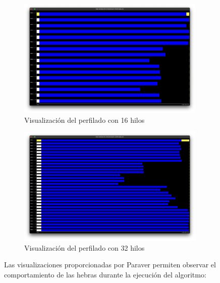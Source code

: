 \documentclass[a4paper, 10pt, onecolumn]{IEEEtran}
\begin{document}
\begin{figure}[H]
  \centering
  \includegraphics[width=0.8\textwidth]{./img/paraver-16threads.png}
  \caption{Visualización del perfilado con 16 hilos}
  \label{fig:paraver_16threads}
\end{figure}

\begin{figure}[H]
  \centering
  \includegraphics[width=0.8\textwidth]{./img/paraver-32threads.png}
  \caption{Visualización del perfilado con 32 hilos}
  \label{fig:paraver_32threads}
\end{figure}

Las visualizaciones proporcionadas por Paraver permiten observar el comportamiento de las hebras durante la ejecución del algoritmo:
\end{document}
